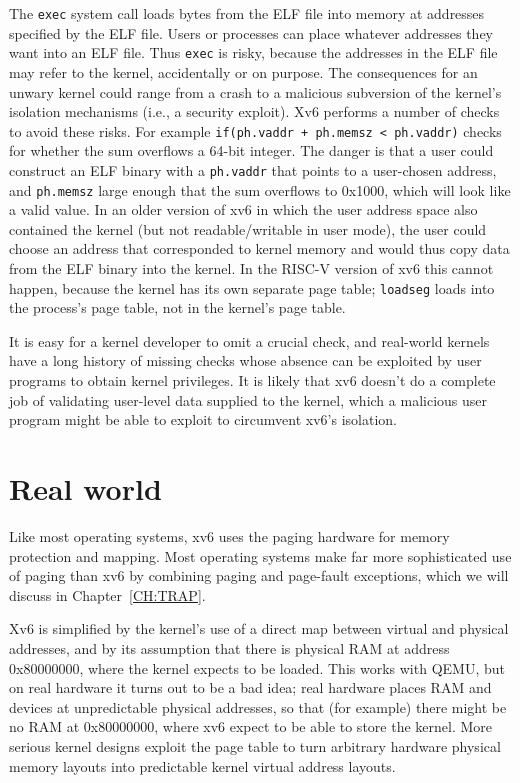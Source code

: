 The \lstinline{exec} system call
loads bytes from the ELF file into memory at addresses specified by the ELF file.
Users or processes can place whatever addresses they want into an ELF file.
Thus
\lstinline{exec}
is risky, because the addresses in the ELF file may refer to the kernel, accidentally
or on purpose. The consequences for an unwary kernel could range from
a crash to a malicious subversion of the kernel's isolation mechanisms
(i.e., a security exploit).
Xv6 performs a number of checks to avoid these risks.
For example
\lstinline{if(ph.vaddr + ph.memsz < ph.vaddr)}
checks for whether the sum overflows a 64-bit integer.
The danger is that a user could construct an ELF binary with a
\lstinline{ph.vaddr}
that points to a user-chosen address,
and
\lstinline{ph.memsz}
large enough that the sum overflows to 0x1000, which will look like a
valid value. In an older version of xv6 in which the user address
space also contained the kernel (but not readable/writable in user
mode), the user could choose an address that corresponded to kernel
memory and would thus copy data from the ELF binary into the kernel.
In the RISC-V version of xv6 this cannot happen, because the kernel has
its own separate page table;
\lstinline{loadseg}
loads into the process's page table, not in the kernel's page table.

It is easy for a kernel developer to omit a crucial check, and
real-world kernels have a long history of missing checks whose absence
can be exploited by user programs to obtain kernel privileges.  It is likely that xv6 doesn't do a complete job of validating
user-level data supplied to the kernel, which a malicious user program might be able to exploit to circumvent xv6's isolation.
\section{Real world}

Like most operating systems, xv6 uses the paging hardware for memory
protection and mapping.  Most operating systems make far more
sophisticated use of paging than xv6 by combining paging and
page-fault exceptions, which we will discuss in
Chapter~\ref{CH:TRAP}.

Xv6 is simplified by the kernel's use of a direct map between virtual
and physical addresses, and by its assumption that there is physical
RAM at address 0x80000000, where the kernel expects to be loaded. This
works with QEMU, but on real hardware it turns out to be a bad idea;
real hardware places RAM and devices at unpredictable physical
addresses, so that (for example) there might be no RAM at 0x80000000,
where xv6 expect to be able to store the kernel. More serious kernel
designs exploit the page table to turn arbitrary hardware physical
memory layouts into predictable kernel virtual address layouts.

